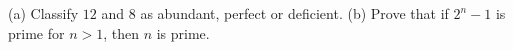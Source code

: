 (a) Classify $12$ and $8$ as abundant, perfect or deficient. (b) Prove that if $2^n-1$ is prime for $n>1$, then $n$ is prime.
